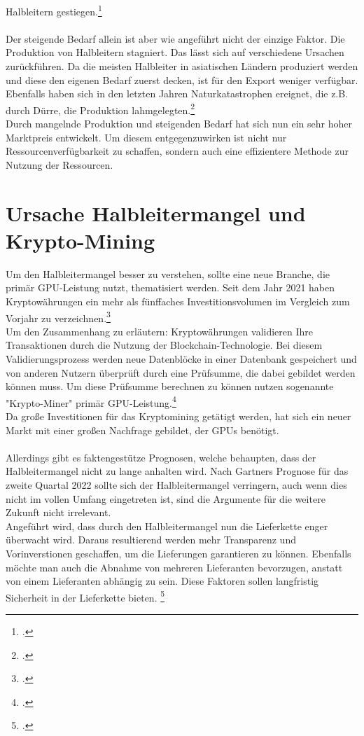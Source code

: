 \documentclass[12pt,toc=bib,toc=listof]{scrreprt}
\begin{document}
Halbleitern gestiegen.\footcite [Vgl.] []{Voas.2021}
\\\\ Der steigende Bedarf allein ist aber wie angeführt nicht der einzige Faktor. Die Produktion 
von Halbleitern stagniert. Das lässt sich auf verschiedene Ursachen zurückführen. Da die meisten 
Halbleiter in asiatischen Ländern produziert werden und diese den eigenen Bedarf zuerst decken, ist 
für den Export weniger verfügbar. Ebenfalls haben sich in den letzten Jahren Naturkatastrophen ereignet, die
z.B. durch Dürre, die Produktion lahmgelegten.\footcite [Vgl.] []{Voas.2021}
\\
Durch mangelnde Produktion und steigenden Bedarf hat sich nun ein sehr hoher Marktpreis entwickelt. 
Um diesem entgegenzuwirken ist nicht nur Ressourcenverfügbarkeit zu schaffen, sondern auch eine effizientere Methode zur Nutzung
der Ressourcen.

\section{Ursache Halbleitermangel und Krypto-Mining}
\label{sec:Ursache Halbleitermangel und Krypto-Mining}

Um den Halbleitermangel besser zu verstehen, sollte eine neue Branche, die primär GPU-Leistung 
nutzt, thematisiert werden. Seit dem Jahr 2021 haben Kryptowährungen ein mehr als fünffaches Investitionsvolumen
im Vergleich zum Vorjahr zu verzeichnen.\footcite [] [] {Statista_Research_1}
\\Um den Zusammenhang zu erläutern: Kryptowährungen validieren Ihre Transaktionen durch die Nutzung der 
Blockchain-Technologie. Bei diesem Validierungsprozess werden neue Datenblöcke in einer Datenbank gespeichert und von anderen
Nutzern überprüft durch eine Prüfsumme, die dabei gebildet werden können muss. Um diese Prüfsumme berechnen zu können
nutzen sogenannte "Krypto-Miner" primär GPU-Leistung.\footcite [Vgl.] [S.259-273] {Arslanian.2022}
\\Da große Investitionen für das Kryptomining getätigt werden, hat sich ein neuer Markt mit einer großen Nachfrage gebildet, der
GPUs benötigt.
\\ \\
%
Allerdings gibt es faktengestütze Prognosen, welche behaupten, dass der Halbleitermangel nicht zu lange anhalten wird. 
Nach Gartners Prognose für das zweite Quartal 2022 sollte sich der Halbleitermangel verringern, auch wenn dies nicht im vollen Umfang eingetreten ist, sind 
die Argumente für die weitere Zukunft nicht irrelevant.\\
Angeführt wird, dass durch den Halbleitermangel nun die Lieferkette enger überwacht wird.
Daraus resultierend werden mehr Transparenz und Vorinverstionen geschaffen, um die Lieferungen garantieren zu können. 
Ebenfalls möchte man auch die Abnahme von mehreren Lieferanten bevorzugen, anstatt von einem Lieferanten abhängig zu sein.
Diese Faktoren sollen langfristig Sicherheit in der Lieferkette bieten. \footcite [Vgl.] [] {Gartner.2021}
\end{document}
